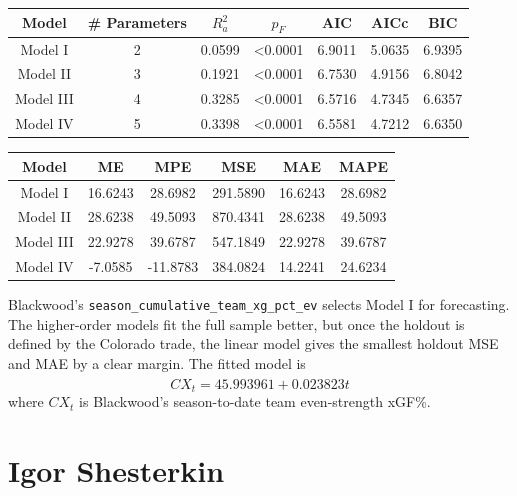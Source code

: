 \documentclass[
  10pt,
]{extarticle}
\begin{document}
\begin{center}
\normalsize

\begin{tabular}{ccccccc}
\toprule
Model & \# Parameters & $R_a^2$ & $p_F$ & AIC & AICc & BIC\\
\midrule
Model I & 2 & 0.0599 & <0.0001 & 6.9011 & 5.0635 & 6.9395\\
Model II & 3 & 0.1921 & <0.0001 & 6.7530 & 4.9156 & 6.8042\\
Model III & 4 & 0.3285 & <0.0001 & 6.5716 & 4.7345 & 6.6357\\
Model IV & 5 & 0.3398 & <0.0001 & 6.5581 & 4.7212 & 6.6350\\
\bottomrule
\end{tabular}
\normalsize
\end{center}\begin{center}
\normalsize

\begin{tabular}{cccccc}
\toprule
Model & ME & MPE & MSE & MAE & MAPE\\
\midrule
Model I & 16.6243 & 28.6982 & 291.5890 & 16.6243 & 28.6982\\
Model II & 28.6238 & 49.5093 & 870.4341 & 28.6238 & 49.5093\\
Model III & 22.9278 & 39.6787 & 547.1849 & 22.9278 & 39.6787\\
Model IV & -7.0585 & -11.8783 & 384.0824 & 14.2241 & 24.6234\\
\bottomrule
\end{tabular}
\normalsize
\end{center}

Blackwood's \texttt{season\_cumulative\_team\_xg\_pct\_ev} selects Model I for forecasting. The higher-order models fit the full sample better, but once the holdout is defined by the Colorado trade, the linear model gives the smallest holdout MSE and MAE by a clear margin. The fitted model is
\[
\widehat{CX}_t = 45.993961 + 0.023823 t
\]
where \(CX_t\) is Blackwood's season-to-date team even-strength xGF\%.

\section{Igor Shesterkin}\label{igor-shesterkin}
\end{document}
